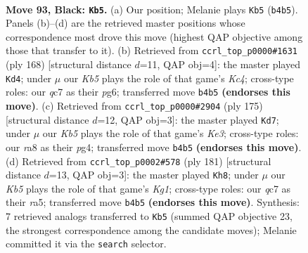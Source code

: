 \documentclass[11pt]{article}
\begin{document}
\clearpage

\begin{figure}[p]\centering
\begin{subfigure}{0.46\textwidth}\centering
\resizebox{\linewidth}{!}{%
\newchessgame
\chessboard[
  setfen={R7/2Q5/6p1/5p2/1k3P2/5K2/8/8 b - - 6 93},
  showmover=false,
  pgfstyle=straightmove, color=movearrow, markmove={b4-b5}
]}
\caption{}
\end{subfigure}\hfill
\begin{subfigure}{0.46\textwidth}\centering
\resizebox{\linewidth}{!}{%
\newchessgame
\chessboard[
  setfen={8/8/4k1p1/5pP1/2K2P2/8/8/8 w - - 4 85},
  showmover=false,
  pgfstyle=straightmove, color=movearrow, markmove={c4-d4}
]}
\caption{}
\end{subfigure}
\\[4pt]
\begin{subfigure}{0.46\textwidth}\centering
\resizebox{\linewidth}{!}{%
\newchessgame
\chessboard[
  setfen={8/8/4k3/2P3p1/3K1pP1/8/8/8 b - - 0 88},
  showmover=false,
  pgfstyle=straightmove, color=movearrow, markmove={e6-d7}
]}
\caption{}
\end{subfigure}\hfill
\begin{subfigure}{0.46\textwidth}\centering
\resizebox{\linewidth}{!}{%
\newchessgame
\chessboard[
  setfen={6k1/1r6/5p2/R7/5KP1/8/8/8 b - - 15 91},
  showmover=false,
  pgfstyle=straightmove, color=movearrow, markmove={g8-h8}
]}
\caption{}
\end{subfigure}
\caption{\textbf{Move 93, Black: \texttt{Kb5}.} (a) Our position; Melanie plays \texttt{Kb5} (\texttt{b4b5}). Panels (b)--(d) are the retrieved master positions whose correspondence most drove this move (highest QAP objective among those that transfer to it). (b) Retrieved from \texttt{ccrl\_top\_p0000\#1631} (ply 168) [structural distance $d$=11, QAP obj=4]: the master played \texttt{Kd4}; under $\mu$ our \emph{Kb5} plays the role of that game's \emph{Kc4}; cross-type roles: our \emph{q}c7 as their \emph{p}g6; transferred move \texttt{b4b5} \textbf{(endorses this move)}. (c) Retrieved from \texttt{ccrl\_top\_p0000\#2904} (ply 175) [structural distance $d$=12, QAP obj=3]: the master played \texttt{Kd7}; under $\mu$ our \emph{Kb5} plays the role of that game's \emph{Ke3}; cross-type roles: our \emph{r}a8 as their \emph{p}g4; transferred move \texttt{b4b5} \textbf{(endorses this move)}. (d) Retrieved from \texttt{ccrl\_top\_p0002\#578} (ply 181) [structural distance $d$=13, QAP obj=3]: the master played \texttt{Kh8}; under $\mu$ our \emph{Kb5} plays the role of that game's \emph{Kg1}; cross-type roles: our \emph{q}c7 as their \emph{r}a5; transferred move \texttt{b4b5} \textbf{(endorses this move)}. Synthesis: 7 retrieved analogs transferred to \texttt{Kb5} (summed QAP objective 23, the strongest correspondence among the candidate moves); Melanie committed it via the \texttt{search} selector.}
\label{fig:thought-m185}
\end{figure}
\end{document}
